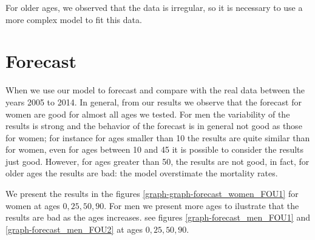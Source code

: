 \documentclass[smallextended]{svjour3}
\begin{document}
For older ages, we observed that the data is irregular, so it is necessary to 
use a more complex model to
fit this data.

\section{Forecast}

When we use our model to forecast and compare with the real data between the 
years 2005 to 2014. In general, from our results we observe that the forecast 
for women are good for almost all ages we tested. For men the variability of 
the results is strong and the behavior of the forecast is in general not good 
as those for women; for instance for ages smaller than 10 the results are quite 
similar than for women, even for ages between 10 and 45 it is possible to 
consider the results just good. However, for ages greater than 50, the results 
are not good, in fact, for older ages the results are bad: the model 
overstimate the mortality rates.  

We present the results in the figures \ref{graph-graph-forecast_women_FOU1} for 
women at ages $0,25,50,90$. For men we present more ages to ilustrate that the 
results are bad as the ages increases. see figures 
\ref{graph-forecast_men_FOU1} and \ref{graph-forecast_men_FOU2} at ages 
$0,25,50,90$. 
\end{document}
